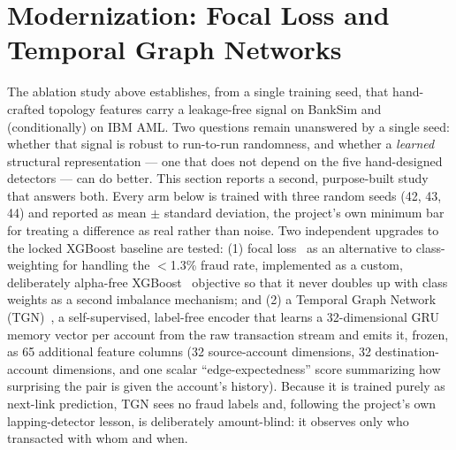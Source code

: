 \section{Modernization: Focal Loss and Temporal Graph Networks}\label{sec:modern}

The ablation study above establishes, from a single training seed, that hand-crafted topology features carry a leakage-free signal on BankSim and (conditionally) on IBM AML. Two questions remain unanswered by a single seed: whether that signal is robust to run-to-run randomness, and whether a \emph{learned} structural representation --- one that does not depend on the five hand-designed detectors --- can do better. This section reports a second, purpose-built study that answers both. Every arm below is trained with three random seeds (42, 43, 44) and reported as mean $\pm$ standard deviation, the project's own minimum bar for treating a difference as real rather than noise. Two independent upgrades to the locked XGBoost baseline are tested: (1) focal loss~\cite{lin2017focal} as an alternative to class-weighting for handling the $<$1.3\% fraud rate, implemented as a custom, deliberately alpha-free XGBoost~\cite{chen2016xgboost} objective so that it never doubles up with class weights as a second imbalance mechanism; and (2) a Temporal Graph Network (TGN)~\cite{rossi2020temporal}, a self-supervised, label-free encoder that learns a 32-dimensional GRU memory vector per account from the raw transaction stream and emits it, frozen, as 65 additional feature columns (32 source-account dimensions, 32 destination-account dimensions, and one scalar ``edge-expectedness'' score summarizing how surprising the pair is given the account's history). Because it is trained purely as next-link prediction, TGN sees no fraud labels and, following the project's own lapping-detector lesson, is deliberately amount-blind: it observes only who transacted with whom and when.

